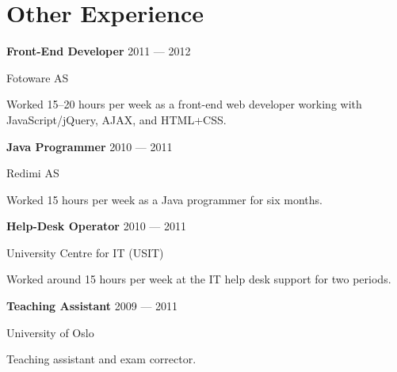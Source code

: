 \section{Other Experience}
\parbox[t][][t]{\linewidth}{
	\parbox{\linewidth}{\textbf{Front-End Developer} \hfill {{2011 --- 2012}}}
	\parbox{\linewidth}{Fotoware AS}
	\smallbreak
	\smallskip
	Worked 15--20 hours per week as a front-end web developer working with
	JavaScript/jQuery, AJAX, and HTML+CSS.
	\bigbreak
	\smallskip
}

\parbox[t][][t]{\linewidth}{
	\parbox{\linewidth}{\textbf{Java Programmer} \hfill {{2010 --- 2011}}}
	\parbox{\linewidth}{Redimi AS}
	\smallbreak
	\smallskip
	Worked 15 hours per week as a Java programmer for six months.
	\bigbreak
	\smallskip
}

\parbox[t][][t]{\linewidth}{
	\parbox{\linewidth}{\textbf{Help-Desk Operator} \hfill {{2010 --- 2011}}}
	\parbox{\linewidth}{University Centre for IT (USIT)}
	\smallbreak
	\smallskip
	Worked around 15 hours per week at the IT help desk support for two
	periods.
	\bigbreak
	\smallskip
}

\parbox[t][][t]{\linewidth}{
	\parbox{\linewidth}{\textbf{Teaching Assistant} \hfill {{2009 --- 2011}}}
	\parbox{\linewidth}{University of Oslo}
	\smallbreak
	\smallskip
	Teaching assistant and exam corrector.
	\bigbreak
	\smallskip
}


